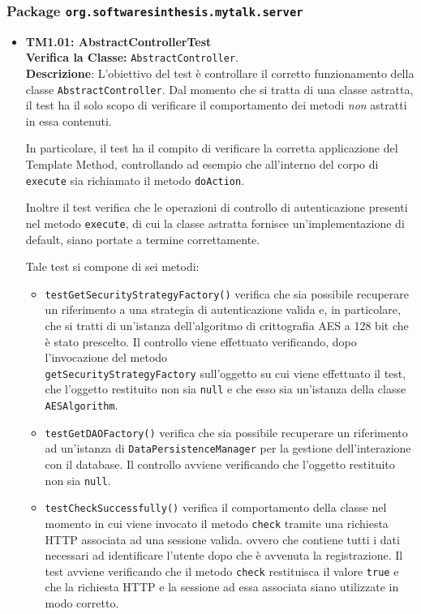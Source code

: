 \subsubsection{Package \texttt{org.softwaresinthesis.mytalk.server}}
\begin{itemize}

\item \textbf{TM1.01: AbstractControllerTest}\\
\textbf{Verifica la Classe:} \texttt{AbstractController}.\\
\textbf{Descrizione}: L'obiettivo del test è controllare il corretto funzionamento della classe \texttt{AbstractController}. Dal momento che si tratta di una classe astratta, il test ha il solo scopo di verificare il comportamento dei metodi \textit{non} astratti in essa contenuti.

In particolare, il test ha il compito di verificare la corretta applicazione del  Template Method, controllando ad esempio che all'interno del corpo di \texttt{execute} sia richiamato il metodo \texttt{doAction}.

Inoltre il test verifica che le operazioni di controllo di autenticazione presenti nel metodo \texttt{execute}, di cui la classe astratta fornisce un'implementazione di default, siano portate a termine correttamente.
 
Tale test si compone di sei metodi:
 \begin{itemize}
 
\item \texttt{testGetSecurityStrategyFactory()} verifica che sia possibile recuperare un riferimento a una strategia di autenticazione valida e, in particolare, che si tratti di un'istanza dell'algoritmo di crittografia AES a 128 bit che è stato prescelto. Il controllo viene effettuato verificando, dopo l'invocazione del metodo \\ \texttt{getSecurityStrategyFactory} sull'oggetto su cui viene effettuato il test, che l'oggetto restituito non sia \texttt{null} e che esso sia un'istanza della classe \texttt{AESAlgorithm}.

\item \texttt{testGetDAOFactory()} verifica che sia possibile recuperare un riferimento ad un'istanza di \texttt{DataPersistenceManager} per la gestione dell'interazione con il database. Il controllo avviene verificando che l'oggetto restituito non sia \texttt{null}.

\item \texttt{testCheckSuccessfully()} verifica il comportamento della classe nel momento in cui viene invocato il metodo \texttt{check} tramite una richiesta HTTP associata ad una sessione valida. ovvero che contiene tutti i dati necessari ad identificare l'utente dopo che è avvenuta la registrazione. Il test avviene verificando che il metodo \texttt{check} restituisca il valore \texttt{true} e che la richiesta HTTP e la sessione ad essa associata siano utilizzate in modo corretto.


\end{itemize}
\end{itemize}

